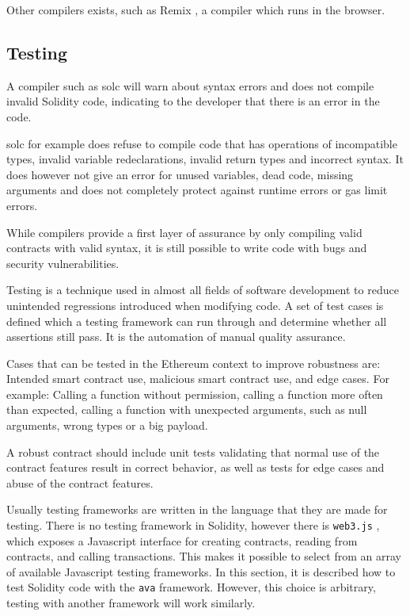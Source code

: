 Other compilers exists, such as Remix \cite{Remix}, a compiler which runs in the browser.

\subsection{Testing}

A compiler such as solc will warn about syntax errors and does not compile invalid Solidity code, indicating to the developer that there is an error in the code.

solc for example does refuse to compile code that has operations of incompatible types, invalid variable redeclarations, invalid return types and incorrect syntax. 
It does however not give an error for unused variables, dead code, missing arguments and does not completely protect against runtime errors or gas limit errors.

While compilers provide a first layer of assurance by only compiling valid contracts with valid syntax, it is still possible to write code with bugs and security vulnerabilities.

Testing is a technique used in almost all fields of software development to reduce unintended regressions introduced when modifying code. A set of test cases is defined which a testing framework can run through and determine whether all assertions still pass. It is the automation of manual quality assurance.

Cases that can be tested in the Ethereum context to improve robustness are: Intended smart contract use, malicious smart contract use, and edge cases. For example: Calling a function without permission, calling a function more often than expected, calling a function with unexpected arguments, such as null arguments, wrong types or a big payload.

A robust contract should include unit tests validating that normal use of the contract features result in correct behavior, as well as tests for edge cases and abuse of the contract features.

Usually testing frameworks are written in the language that they are made for testing. There is no testing framework in  Solidity, however there is \texttt{web3.js} \cite{web3}, which exposes a Javascript interface for creating contracts, reading from contracts, and calling transactions. This makes it possible to select from an array of available Javascript testing frameworks. In this section, it is described how to test Solidity code with the \texttt{ava} \cite{ava} framework. However, this choice is arbitrary, testing with another framework will work similarly.


